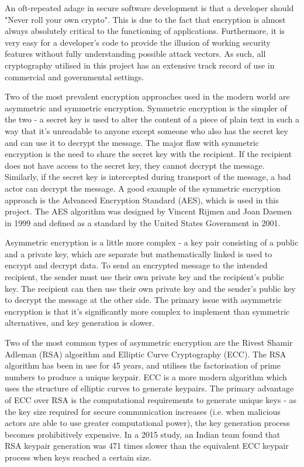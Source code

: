 \documentclass{mproj}
\begin{document}
An oft-repeated adage in secure software development is that a developer should "Never roll your own crypto"\cite{apvrille2005secure}. This is due to the fact that encryption is almost always absolutely critical to the functioning of applications. Furthermore, it is very easy for a developer's code to provide the illusion of working security features without fully understanding possible attack vectors. As such, all cryptography utilised in this project has an extensive track record of use in commercial and governmental settings.

Two of the most prevalent encryption approaches used in the modern world are asymmetric and symmetric encryption. Symmetric encryption is the simpler of the two - a secret key is used to alter the content of a piece of plain text in such a way that it's unreadable to anyone except someone who also has the secret key and can use it to decrypt the message. The major flaw with symmetric encryption is the need to share the secret key with the recipient. If the recipient does not have access to the secret key, they cannot decrypt the message. Similarly, if the secret key is intercepted during transport of the message, a bad actor can decrypt the message. A good example of the symmetric encryption approach is the Advanced Encryption Standard (AES), which is used in this project. The AES algorithm was designed by Vincent Rijmen and Joan Daemen in 1999 and defined as a standard by the United States Government in 2001.

Asymmetric encryption is a little more complex - a key pair consisting of a public and a private key, which are separate but mathematically linked is used to encrypt and decrypt data. To send an encrypted message to the intended recipient, the sender must use their own private key and the recipient's public key. The recipient can then use their own private key and the sender's public key to decrypt the message at the other side. The primary issue with asymmetric encryption is that it's significantly more complex to implement than symmetric alternatives, and key generation is slower.

Two of the most common types of asymmetric encryption are the Rivest Shamir Adleman (RSA) algorithm\cite{rivest2019method} and Elliptic Curve Cryptography (ECC)\cite{lopez2000overview}. The RSA algorithm has been in use for 45 years, and utilises the factorisation of prime numbers to produce a unique keypair. ECC is a more modern algorithm which uses the structure of elliptic curves to generate keypairs. The primary advantage of ECC over RSA is the computational requirements to generate unique keys - as the key size required for secure communication increases (i.e. when malicious actors are able to use greater computational power), the key generation process becomes prohibitively expensive. In a 2015 study, an Indian team found that RSA keypair generation was 471 times slower than the equivalent ECC keypair process when keys reached a certain size\cite{gobi2015comparative}.
\end{document}
